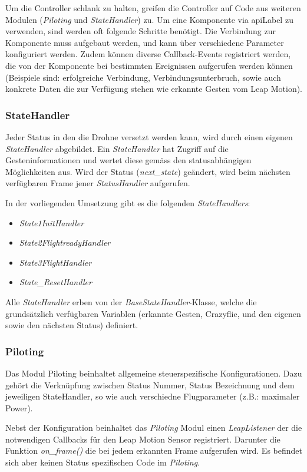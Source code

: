 Um die Controller schlank zu halten, greifen die Controller auf Code aus weiteren Modulen (\textit{Piloting} und \textit{StateHandler}) zu.
Um eine Komponente via \gls{apiLabel} zu verwenden, sind werden oft folgende Schritte benötigt.
Die Verbindung zur Komponente muss aufgebaut werden, und kann über verschiedene Parameter konfiguriert werden.
Zudem können diverse Callback-Events registriert werden, die von der Komponente bei bestimmten Ereignissen aufgerufen werden können (Beispiele sind: erfolgreiche Verbindung, Verbindungsunterbruch, sowie auch konkrete Daten die zur Verfügung stehen wie erkannte Gesten vom Leap Motion).

\subsubsection{StateHandler}
Jeder Status in den die Drohne versetzt werden kann, wird durch einen eigenen \textit{StateHandler} abgebildet.
Ein \textit{StateHandler} hat Zugriff auf die Gesteninformationen und wertet diese gemäss den statusabhängigen Möglichkeiten aus.
Wird der Status (\textit{next\_state}) geändert, wird beim nächsten verfügbaren Frame jener \textit{StatusHandler} aufgerufen.

In der vorliegenden Umsetzung gibt es die folgenden \textit{StateHandlers}:
\begin{itemize}
	\item \textit{State1InitHandler}
	\item \textit{State2FlightreadyHandler}
	\item \textit{State3FlightHandler}
	\item \textit{State\_ResetHandler}
\end{itemize}
Alle \textit{StateHandler} erben von der \textit{BaseStateHandler}-Klasse, welche die grundsätzlich verfügbaren Variablen (erkannte Gesten, Crazyflie, und den eigenen sowie den nächsten Status) definiert.

\subsubsection{Piloting}
Das Modul Piloting beinhaltet allgemeine steuerspezifische Konfigurationen.
Dazu gehört die Verknüpfung zwischen Status Nummer, Status Bezeichnung und dem jeweiligen StateHandler, so wie auch verschiedne Flugparameter (z.B.: maximaler Power).

Nebst der Konfiguration beinhaltet das \textit{Piloting} Modul einen \textit{LeapListener} der die notwendigen Callbacks für den Leap Motion Sensor registriert. Darunter die Funktion \textit{on\_frame()} die bei jedem erkannten Frame aufgerufen wird.
Es befindet sich aber keinen Status spezifischen Code im \textit{Piloting}.

